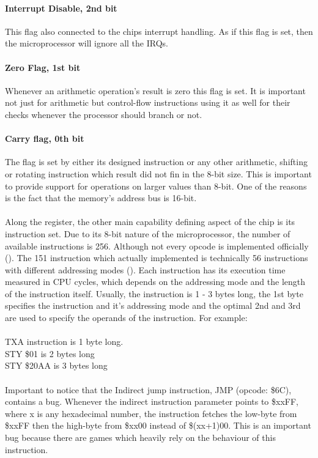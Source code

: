 \documentclass[]{report}
\begin{document}
\paragraph{Interrupt Disable, 2nd bit}
This flag also connected to the chips interrupt handling. As if this flag is set, then the microprocessor will ignore all the IRQs. 

\paragraph{Zero Flag, 1st bit}
Whenever an arithmetic operation's result is zero this flag is set. It is important not just for arithmetic but control-flow instructions using it as well for their checks whenever the processor should branch or not.

\paragraph{Carry flag, 0th bit}
The flag is set by either its designed instruction or any other arithmetic, shifting or rotating instruction which result did not fin in the 8-bit size.
This is important to provide support for operations on larger values than 8-bit. One of the reasons is the fact that the memory's address bus is 16-bit. 

\paragraph{ }
Along the register, the other main capability defining aspect of the chip is its instruction set. Due to its 8-bit nature of the microprocessor, the number of available instructions is 256. Although not every opcode is implemented officially (\cite{INST}). The 151 instruction which actually implemented is technically 56 instructions with different addressing modes (\cite{ADDR}). Each instruction has its execution time measured in CPU cycles, which depends on the addressing mode and the length of the instruction itself. Usually, the instruction is 1 - 3 bytes long, the 1st byte specifies the instruction and it's addressing mode and the optimal 2nd and 3rd are used to specify the operands of the instruction. For example:
\\
\\
TXA instruction is 1 byte long.
\\
STY \$01 is 2 bytes long 
\\
STY \$20AA is 3 bytes long
\\
\\
Important to notice that the Indirect jump instruction, JMP (opcode: \$6C), contains a bug. Whenever the indirect instruction parameter points to \$xxFF, where x is any hexadecimal number, the instruction fetches the low-byte from \$xxFF then the high-byte from \$xx00 instead of \$(xx+1)00. This is an important bug because there are games which heavily rely on the behaviour of this instruction.
\end{document}
